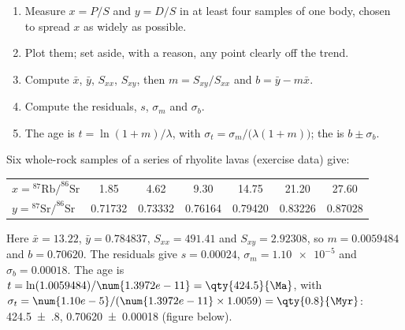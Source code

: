 \begin{method}\label{met:b1:radiometric-methods:isochron}
\begin{enumerate}
  \item Measure $x = P/S$ and $y = D/S$ in at least four samples of one body,
        chosen to spread $x$ as widely as possible.
  \item Plot them; set aside, with a reason, any point clearly off the trend.
  \item Compute $\bar x$, $\bar y$, $S_{xx}$, $S_{xy}$, then $m = S_{xy}/S_{xx}$
        and $b = \bar y - m \bar x$.
  \item Compute the residuals, $s$, $\sigma_m$ and $\sigma_b$.
  \item The age is $t = \ln(1+m)/\lambda$, with $\sigma_t =
        \sigma_m/\bigl(\lambda(1+m)\bigr)$; the  is $b \pm \sigma_b$.
\end{enumerate}
\end{method}

\begin{example}\label{ex:b1:radiometric-methods:rhyolite}
Six whole-rock samples of a series of rhyolite lavas (exercise data) give:
\begin{center}
\small
\begin{tabular}{|l|cccccc|}
\hline
$x = {}^{87}\mathrm{Rb}/^{86}\mathrm{Sr}$ & 1.85 & 4.62 & 9.30 & 14.75 & 21.20 & 27.60 \\
$y = {}^{87}\mathrm{Sr}/^{86}\mathrm{Sr}$ & 0.71732 & 0.73332 & 0.76164 & 0.79420 & 0.83226 & 0.87028 \\
\hline
\end{tabular}
\end{center}
Here $\bar x = 13.22$, $\bar y = 0.784837$, $S_{xx} = 491.41$ and
$S_{xy} = 2.92308$, so $m = 0.0059484$ and $b = 0.70620$. The residuals give
$s = 0.00024$, $\sigma_m = \num{1.10e-5}$ and $\sigma_b = 0.00018$. The age is
$t = \ln(1.0059484)/\num{1.3972e-11} = \qty{424.5}{\Ma}$, with
$\sigma_t = \num{1.10e-5}/(\num{1.3972e-11} \times 1.0059) = \qty{0.8}{\Myr}$:
\qty[uncertainty-mode=separate]{424.5(8)}{\Ma}, 
\num[uncertainty-mode=separate]{0.70620(18)} (figure below).
\end{example}

